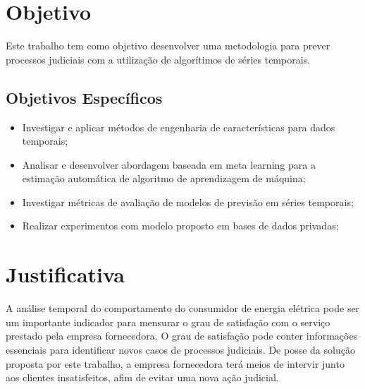 \documentclass[../main.tex]{subfiles}
\begin{document}
\section{Objetivo}

Este trabalho tem como objetivo desenvolver uma metodologia para prever processos judiciais com a utilização de algorítimos de séries temporais.
\subsection{Objetivos Específicos}
\begin{itemize}
    \item Investigar e aplicar métodos de engenharia de características para dados temporais;
	\item Analisar e desenvolver abordagem baseada em meta learning para a estimação automática de algoritmo de aprendizagem de máquina;
	\item Investigar métricas de avaliação de modelos de previsão em séries temporais;
	\item Realizar experimentos com modelo proposto em bases de dados privadas;
\end{itemize}

\section{Justificativa}

A análise temporal do comportamento do consumidor de energia elétrica pode ser um importante indicador para mensurar o grau de satisfação com o serviço prestado pela empresa fornecedora. O grau de satisfação pode conter informações essenciais para  identificar novos casos de processos judiciais. De posse da solução proposta por este trabalho, a empresa fornecedora terá meios de intervir junto aos clientes insatisfeitos, afim de evitar uma nova ação judicial.
\end{document}
